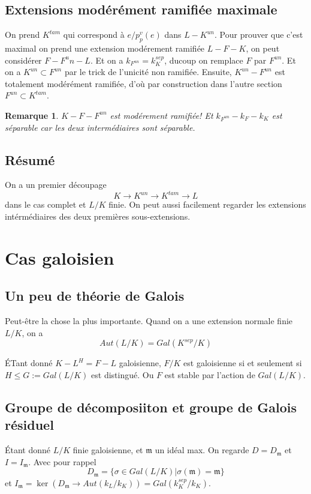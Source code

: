 \documentclass[a4paper,12pt]{book}
\newcommand{\m}{\mathfrak m}
\theoremstyle{plain}
\newtheorem{rem}{Remarque}
\theoremstyle{definition}
\theoremstyle{remark}
\begin{document}
\section{Extensions modérément ramifiée maximale}
On prend $K^{tam}$ qui correspond à $e/p^v_p(e)$ dans $L-K^{un}$.
Pour prouver que c'est maximal on prend une extension modérement
ramifiée $L-F-K$, on peut considérer $F-F^un-L$. Et on a
$k_{F^{un}}=k_K^{sep}$, ducoup on remplace $F$ par $F^{un}$. Et
on a $K^{un}\subset F^{un}$ par le trick de l'unicité non ramifiée.
Ensuite, $K^{un}-F^{un}$ est totalement modérément ramifiée,
d'où par construction dans l'autre section $F^{un}\subset K^{tam}$.

\begin{rem}
    $K-F-F^{un}$ est modérement ramifiée! Et $k_{F^{un}}-k_F-k_K$
    est séparable car les deux intermédiaires sont séparable.
\end{rem}

\section{Résumé}
On a un premier découpage 
\[K\to K^{un}\to K^{tam}\to L\]
dans le cas complet et $L/K$ finie. On peut aussi facilement 
regarder les extensions intérmédiaires des deux premières 
sous-extensions.


\chapter{Cas galoisien}
\section{Un peu de théorie de Galois}
Peut-être la chose la plus importante. Quand on a une extension
normale finie $L/K$, on a 
\[Aut(L/K)=Gal(K^{sep}/K)\]

ÉTant donné $K-L^H=F-L$ galoisienne, $F/K$ est galoisienne si et
seulement si $ H\leq G:=Gal(L/K)$ est distingué. Ou $F$ est stable
par l'action de $Gal(L/K)$.

\section{Groupe de décomposiiton et groupe de Galois résiduel}
Étant donné $L/K$ finie galoisienne, et $\m$ un idéal max.
On regarde $D=D_\m$ et $I=I_\m$. Avec pour rappel
\[D_\m=\{\sigma\in Gal(L/K)|\sigma(\m)=\m\}\]
et $I_\m=\ker(D_\m\to Aut(k_L/k_K))=Gal(k_K^{sep}/k_K)$. 
\end{document}
